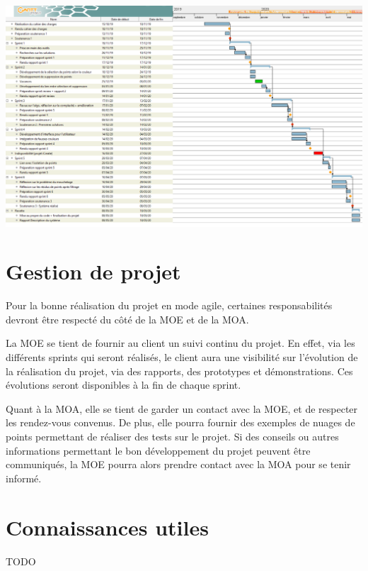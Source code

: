 \documentclass[12pt,titlepage,french]{article}
\begin{document}
\begin{center}
    \includegraphics[scale=0.5,angle=90,origin=c]{gantt.png}
    \label{fig:Planning détaillé}
\end{center}


\section{Gestion de projet}

Pour la bonne réalisation du projet en mode agile, certaines responsabilités devront être respecté du côté de la MOE et de la MOA.

La MOE se tient de fournir au client un suivi continu du projet. En effet, via les différents sprints qui seront réalisés, le client aura une visibilité sur l'évolution de la réalisation du projet, via des rapports, des prototypes et démonstrations. Ces évolutions seront disponibles à la fin de chaque sprint.

Quant à la MOA, elle se tient de garder un contact avec la MOE, et de respecter les rendez-vous convenus. De plus, elle pourra fournir des exemples de nuages de points permettant de réaliser des tests sur le projet. Si des conseils ou autres informations permettant le bon développement du projet peuvent être communiqués, la MOE pourra alors prendre contact avec la MOA pour se tenir informé.

\section{Connaissances utiles}

TODO
\end{document}
